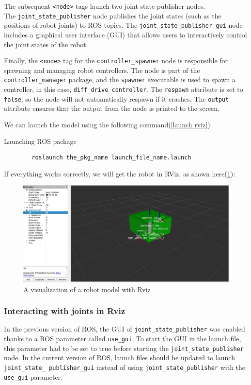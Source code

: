 \documentclass[../../main]{subfiles}
\begin{document}
    The subsequent \texttt{<node>} tags launch two joint state publisher nodes.\\ The \texttt{joint\_state\_publisher} node publishes the joint states (such as the positions of robot joints) to ROS topics. The \texttt{joint\_state\_publisher\_gui} node includes a graphical user interface (GUI) that allows users to interactively control the joint states of the robot.
    
    Finally, the \texttt{<node>} tag for the \texttt{controller\_spawner} node is responsible for spawning and managing robot controllers. The node is part of the \texttt{controller\_manager} package, and the \texttt{spawner} executable is used to spawn a controller, in this case, \texttt{diff\_drive\_controller}. The \texttt{respawn} attribute is set to \texttt{false}, so the node will not automatically respawn if it crashes. The \texttt{output} attribute ensures that the output from the node is printed to the screen.
    
    We can launch the model using the following command(\cref{launch rviz}):
    \begin{codebox}[label=launch rviz]{Launching ROS package}
      \begin{verbatim}
        roslaunch the_pkg_name launch_file_name.launch
      \end{verbatim}
      \end{codebox}
    If everything works correctly, we will get the robot in RViz, as shown
    here(\cref{A visualization of a robot model with Rviz}):
    \begin{figure}[h!]
        \centering
        \includegraphics[width=\textwidth]{img/roborRvz1.jpg}
        \caption{A visualization of a robot model with Rviz}
\label{A visualization of a robot model with Rviz}
    \end{figure}
    \newpage
\subsubsection{Interacting with joints in Rviz}
In the previous version of ROS, the GUI of \texttt{joint\_state\_publisher} was enabled
thanks to a ROS parameter called \texttt{use\_gui}. To start the GUI in the launch file, this
parameter had to be set to true before starting the \texttt{joint\_state\_publisher} node.
In the current version of ROS, launch files should be updated to launch \texttt{joint\_state\_
publisher\_gui} instead of using \texttt{joint\_state\_publisher} with the \texttt{use\_gui}
parameter.
\end{document}
